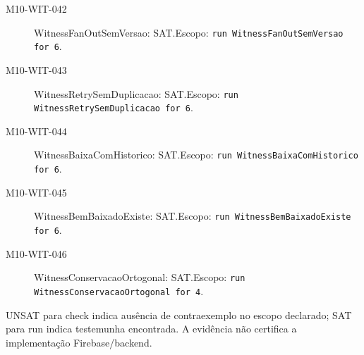 \begin{description}
\item[M10-WIT-042] WitnessFanOutSemVersao: SAT.\newline Escopo: \texttt{run WitnessFanOutSemVersao for 6}.
\item[M10-WIT-043] WitnessRetrySemDuplicacao: SAT.\newline Escopo: \texttt{run WitnessRetrySemDuplicacao for 6}.
\item[M10-WIT-044] WitnessBaixaComHistorico: SAT.\newline Escopo: \texttt{run WitnessBaixaComHistorico for 6}.
\item[M10-WIT-045] WitnessBemBaixadoExiste: SAT.\newline Escopo: \texttt{run WitnessBemBaixadoExiste for 6}.
\item[M10-WIT-046] WitnessConservacaoOrtogonal: SAT.\newline Escopo: \texttt{run WitnessConservacaoOrtogonal for 4}.
\end{description}
UNSAT para check indica ausência de contraexemplo no escopo declarado; SAT para run indica testemunha encontrada. A evidência não certifica a implementação Firebase/backend.
